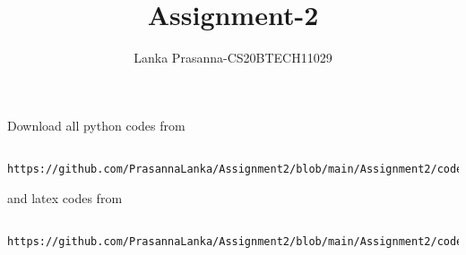\documentclass[journal,12pt,twocolumn]{IEEEtran}
\DeclareMathOperator*{\Res}{Res}
\begin{document}
\newcommand{\BEQA}{\begin{eqnarray}}
\newcommand{\EEQA}{\end{eqnarray}}
\newcommand{\define}{\stackrel{\triangle}{=}}

\raggedbottom
\setlength{\parindent}{0pt}
\providecommand{\mbf}{\mathbf}
\providecommand{\pr}[1]{\ensuremath{\Pr\left(#1\right)}}
\providecommand{\qfunc}[1]{\ensuremath{Q\left(#1\right)}}
\providecommand{\sbrak}[1]{\ensuremath{{}\left[#1\right]}}
\providecommand{\lsbrak}[1]{\ensuremath{{}\left[#1\right.}}
\providecommand{\rsbrak}[1]{\ensuremath{{}\left.#1\right]}}
\providecommand{\brak}[1]{\ensuremath{\left(#1\right)}}
\providecommand{\lbrak}[1]{\ensuremath{\left(#1\right.}}
\providecommand{\rbrak}[1]{\ensuremath{\left.#1\right)}}
\providecommand{\cbrak}[1]{\ensuremath{\left\{#1\right\}}}
\providecommand{\lcbrak}[1]{\ensuremath{\left\{#1\right.}}
\providecommand{\rcbrak}[1]{\ensuremath{\left.#1\right\}}}
\theoremstyle{remark}
\newtheorem{rem}{Remark}
\newcommand{\sgn}{\mathop{\mathrm{sgn}}}
\providecommand{\abs}[1]{\vert#1\vert}
\providecommand{\res}[1]{\Res\displaylimits_{#1}} 
\providecommand{\norm}[1]{\lVert#1\rVert}
\providecommand{\mtx}[1]{\mathbf{#1}}
\providecommand{\mean}[1]{E[ #1 ]}
\providecommand{\fourier}{\overset{\mathcal{F}}{ \rightleftharpoons}}
\providecommand{\system}{\overset{\mathcal{H}}{ \longleftrightarrow}}
\newcommand{\solution}{\noindent \textbf{Solution: }}
\newcommand{\cosec}{\,\text{cosec}\,}
\providecommand{\dec}[2]{\ensuremath{\overset{#1}{\underset{#2}{\gtrless}}}}
\newcommand{\myvec}[1]{\ensuremath{\begin{pmatrix}#1\end{pmatrix}}}
\newcommand{\mydet}[1]{\ensuremath{\begin{vmatrix}#1\end{vmatrix}}}
\makeatletter
{}
\makeatother
\let\StandardTheFigure\thefigure
\let\vec\mathbf
\renewcommand{\thefigure}{\theproblem}
\def\putbox#1#2#3{\makebox[0in][l]{\makebox[#1][l]{}\raisebox{\baselineskip}[0in][0in]{\raisebox{#2}[0in][0in]{#3}}}}
     \def\rightbox#1{\makebox[0in][r]{#1}}
     \def\centbox#1{\makebox[0in]{#1}}
     \def\topbox#1{\raisebox{-\baselineskip}[0in][0in]{#1}}
     \def\midbox#1{\raisebox{-0.5\baselineskip}[0in][0in]{#1}}
\vspace{3cm}
\title{Assignment-2}
\author{Lanka Prasanna-CS20BTECH11029}
\maketitle
\newpage
\bigskip
\renewcommand{\thefigure}{\theenumi}
\renewcommand{\thetable}{\theenumi}
Download all python codes from
\begin{lstlisting}
    https://github.com/PrasannaLanka/Assignment2/blob/main/Assignment2/codes/assignment2.py
\end{lstlisting}
and latex codes from 
\begin{lstlisting}
    https://github.com/PrasannaLanka/Assignment2/blob/main/Assignment2/codes/main.tex
\end{lstlisting}
\end{document}
